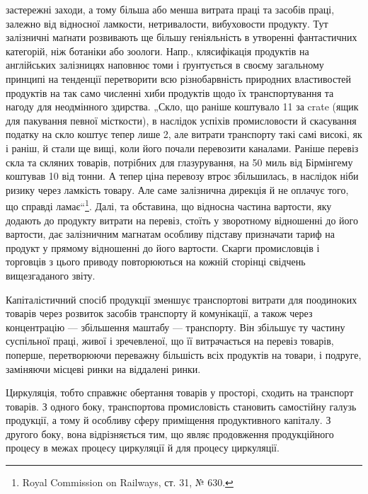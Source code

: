 \parcont{}  %
застережні заходи, а тому більша або менша витрата праці та засобів
праці, залежно від відносної ламкости, нетривалости, вибуховости продукту.
Тут залізничні маґнати розвивають ще більшу геніяльність в утворенні
фантастичних категорій, ніж ботаніки або зоологи. Напр., клясифікація
продуктів на англійських залізницях наповнює томи і ґрунтується
в своєму загальному принципі на тенденції перетворити всю різнобарвність
природних властивостей продуктів на так само численні хиби продуктів
щодо їх транспортування та нагоду для неодмінного здирства.
„Скло, що раніше коштувало 11 за crate (ящик для пакування
певної місткости), в наслідок успіхів промисловости й скасування податку
на скло коштує тепер лише 2, але витрати транспорту такі самі
високі, як і раніш, й стали ще вищі, коли його почали перевозити каналами.
Раніше перевіз скла та скляних товарів, потрібних для глазурування,
на 50 миль від Бірмінгему коштував 10 від тонни. А
тепер ціна перевозу втроє збільшилась, в наслідок ніби ризику через
ламкість товару. Але саме залізнична дирекція й не оплачує того, що
справді ламає“\footnote{
Royal Commission on Railways, ст. 31, № 630.
}. Далі, та обставина, що відносна частина вартости, яку
додають до продукту витрати на перевіз, стоїть у зворотному відношенні
до його вартости, дає залізничним магнатам особливу підставу призначати
тариф на продукт у прямому відношенні до його вартости. Скарги промисловців
і торговців з цього приводу повторюються на кожній сторінці
свідчень вищезгаданого звіту.

Капіталістичний спосіб продукції зменшує транспортові витрати для
поодиноких товарів через розвиток засобів транспорту й комунікації, а
також через концентрацію — збільшення маштабу — транспорту. Він збільшує
ту частину суспільної праці, живої і зречевленої, що її витрачається
на перевіз товарів, поперше, перетворюючи переважну більшість всіх
продуктів на товари, і подруге, заміняючи місцеві ринки на віддалені
ринки.

Циркуляція, тобто справжнє обертання товарів у просторі, сходить на
транспорт товарів. З одного боку, транспортова промисловість становить
самостійну галузь продукції, а тому й особливу сферу приміщення продуктивного
капіталу. З другого боку, вона відрізняється тим, що являє
продовження продукційного процесу в межах процесу циркуляції й
для процесу циркуляції.
